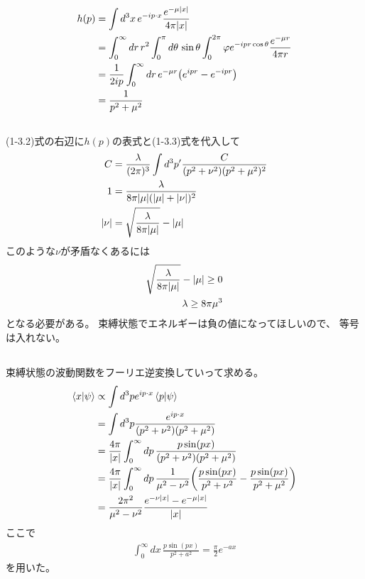\documentclass[../../master.tex]{subfiles}
\begin{document}
\subsection{}
\begin{align}
    h(p)
    &= \int d^3x\, e^{-ip\cdot x} \frac{e^{-\mu\abs{x}}}{4\pi\abs{x}}\\
    &= \int_0^\infty dr\,r^2 \int_{0}^{\pi} d\theta \,\sin\theta \int_{0}^{2\pi}\varphi
        e^{-ipr\cos\theta}\frac{e^{-\mu r}}{4\pi r}\\
    &= \frac{1}{2ip} \int_{0}^{\infty}dr\, e^{-\mu r}\qty(e^{ipr}-e^{-ipr})\\
    &= \frac{1}{p^2+\mu^2}
\end{align}

\subsection{}
(1-3.2)式の右辺に\(h(p)\)の表式と(1-3.3)式を代入して
\begin{align}
    C &= \frac{\lambda}{(2\pi)^3}\int d^3p' \frac{C}{(p^2+\nu^2)(p^2+\mu^2)^2}\\
    1 &= \frac{\lambda}{8\pi\abs{\mu}(\abs{\mu}+\abs{\nu})^2}\\
    \abs{\nu} &= \sqrt{\frac{\lambda}{8\pi\abs{\mu}}}-\abs{\mu}
\end{align}
このような\(\nu\)が矛盾なくあるには
\begin{align}
    \sqrt{\frac{\lambda}{8\pi\abs{\mu}}}-\abs{\mu} \ge 0\\
    \lambda \ge 8\pi\mu^3
\end{align}
となる必要がある。
束縛状態でエネルギーは負の値になってほしいので、
等号は入れない。

\subsection{}
束縛状態の波動関数をフーリエ逆変換していって求める。
\begin{align}
    \braket{x}{\psi}
    &\propto \int d^3 p e^{ip\cdot x} \braket{p}{\psi}\\
    &= \int d^3 p \frac{e^{ip\cdot x}}{(p^2+\nu^2)(p^2+\mu^2)}\\
    &= \frac{4\pi}{\abs{x}}\int_{0}^{\infty} dp\, \frac{p\sin(px)}{(p^2+\nu^2)(p^2+\mu^2)}\\
    &= \frac{4\pi}{\abs{x}}\int_{0}^{\infty} dp\, \frac{1}{\mu^2-\nu^2}\qty(
        \frac{p\sin(px)}{p^2+\nu^2}
        -\frac{p\sin(px)}{p^2+\mu^2}
        )\\
    &= \frac{2\pi^2}{\mu^2-\nu^2}\frac{e^{-\nu \abs{x}}-e^{-\mu \abs{x}}}{\abs{x}}
\end{align}
ここで
\begin{align}
    \int_{0}^{\infty}dx\, \frac{p\sin(px)}{p^2+a^2} = \frac{\pi}{2}e^{-ax}
\end{align}
を用いた。
\end{document}
